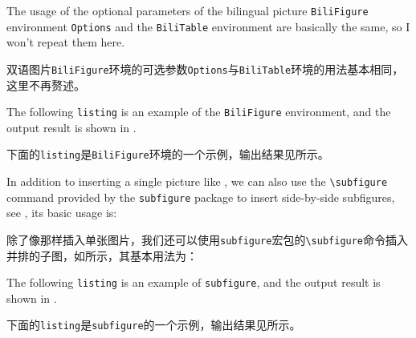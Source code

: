 \begin{ParaColumn}

    The usage of the optional parameters of the bilingual picture  \verb"BiliFigure" environment \verb"Options" and the \verb"BiliTable" environment are basically the same, so I won't repeat them here.

    \switchcolumn

    双语图片\verb"BiliFigure"环境的可选参数\verb"Options"与\verb"BiliTable"环境的用法基本相同，这里不再赘述。

    \switchcolumn*

    The following \verb"listing" is an example of the \verb"BiliFigure" environment, and the output result is shown in .

    \switchcolumn

    下面的\verb"listing"是\verb"BiliFigure"环境的一个示例，输出结果见所示。

\end{ParaColumn}



\begin{ParaColumn}

    In addition to inserting a single picture like , we can also use the \verb"\subfigure" command provided by the \verb"subfigure" package to insert side-by-side subfigures, see , its basic usage is:

    \switchcolumn

    除了像那样插入单张图片，我们还可以使用\verb"subfigure"宏包的\verb"\subfigure"命令插入并排的子图，如所示，其基本用法为：

\end{ParaColumn}



\begin{ParaColumn}

    The following \verb"listing" is an example of \verb"subfigure", and the output result is shown in .

    \switchcolumn
    
    下面的\verb"listing"是\verb"subfigure"的一个示例，输出结果见所示。

\end{ParaColumn}

